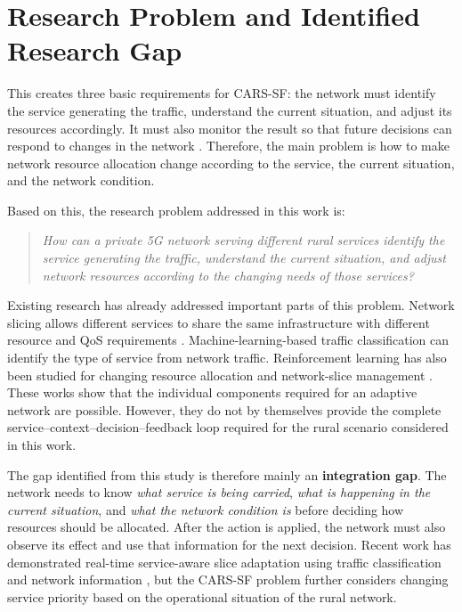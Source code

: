 \documentclass[12pt,a4paper]{report}
\begin{document}
\section{Research Problem and Identified Research Gap}
\label{sec:research_gap}

This creates three basic requirements for CARS-SF: the network must
identify the service generating the traffic, understand the current
situation, and adjust its resources accordingly. It must also monitor
the result so that future decisions can respond to changes in the
network \cite{moysen2018selforganized}. Therefore, the main problem is
how to make network resource allocation change according to the service,
the current situation, and the network condition.

Based on this, the research problem addressed in this work is:

\begin{quote}
	\emph{How can a private 5G network serving different rural services
		identify the service generating the traffic, understand the current
		situation, and adjust network resources according to the changing
		needs of those services?}
\end{quote}

Existing research has already addressed important parts of this
problem. Network slicing allows different services to share the same
infrastructure with different resource and QoS requirements
\cite{kazmi2019slicing}. Machine-learning-based traffic
classification can identify the type of service from network traffic. Reinforcement learning has
also been studied for changing resource allocation and network-slice
management \cite{li2018drl,yan2019irs,sciancalepore2019rlnsb}. These
works show that the individual components required for an adaptive
network are possible. However, they do not by themselves provide the
complete service--context--decision--feedback loop required for the
rural scenario considered in this work.

The gap identified from this study is therefore mainly an
\textbf{integration gap}. The network needs to know \emph{what service
	is being carried}, \emph{what is happening in the current situation},
and \emph{what the network condition is} before deciding how resources
should be allocated. After the action is applied, the network must also
observe its effect and use that information for the next decision.
Recent work has demonstrated real-time service-aware slice adaptation
using traffic classification and network information
\cite{tsourdinis2024serviceaware}, but the CARS-SF problem further
considers changing service priority based on the operational situation
of the rural network.
\end{document}
